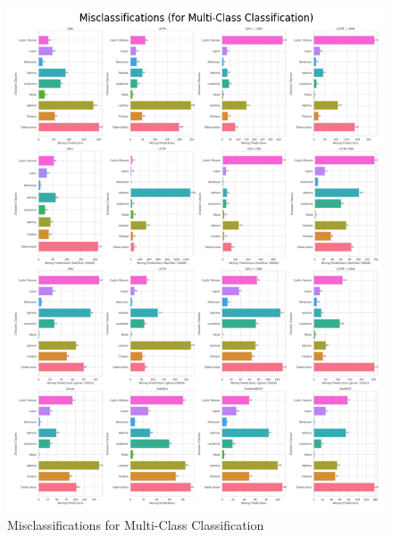 \documentclass[12pt]{report}
\begin{document}
\begin{figure}[H]
\centering
\includegraphics[width=0.8\linewidth]{multi_misclassifications.png}
\caption{Misclassifications for Multi-Class Classification}
\label{fig:multi_misclassifications}
\end{figure}
\end{document}
